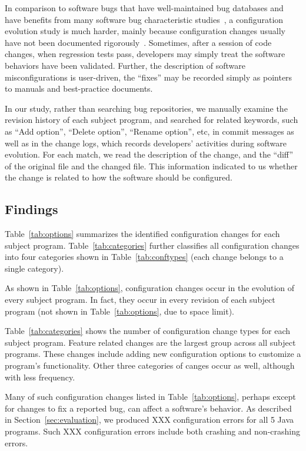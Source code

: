 In comparison to software bugs that have well-maintained
bug databases and have benefits from many
software bug characteristic studies~\cite{},
a configuration evolution study is much harder, mainly
because configuration changes usually have not been
documented rigorously~\cite{}. Sometimes, after a
session of code changes, when
regression tests pass, developers may simply treat the
software behaviors have been validated. Further,
the description of software misconfigurations is user-driven,
the ``fixes'' may be recorded simply as pointers
to manuals and best-practice documents.

In our study, rather than searching bug repositories,
we manually examine the revision history of each subject program,
and searched for related keywords, such as ``Add option'',
``Delete option'', ``Rename option'', etc,
in commit messages as well as in the change logs,
which records developers' activities
during software evolution. For each match,
we read the description of the change,
and the ``diff'' of the original file and the
changed file. This information indicated
to us whether the change is related to how the
software should be configured.




\subsection{Findings}

Table~\ref{tab:options} summarizes the identified
configuration changes for each subject program.
Table~\ref{tab:categories} further classifies all
configuration changes into four categories shown
in Table~\ref{tab:conftypes} (each change belongs to a single category).


As shown in Table~\ref{tab:options}, configuration changes occur
in the evolution of every subject program. In fact, they occur in
every revision of each subject program (not shown in Table~\ref{tab:options},
due to space limit). 

Table~\ref{tab:categories} shows the number of
configuration change types for each subject program.
Feature related changes are the largest group across
all subject programs. These changes include
adding new configuration options to customize a program's
functionality. Other three categories of canges occur as well, although
with less frequency.

Many of such configuration changes listed in Table~\ref{tab:options},
perhaps except for changes to fix a reported bug, can affect
a software's behavior. As described in Section~\ref{sec:evaluation},
we produced XXX configuration errors for all 5 Java programs.
Such XXX configuration errors include both crashing and non-crashing errors.


